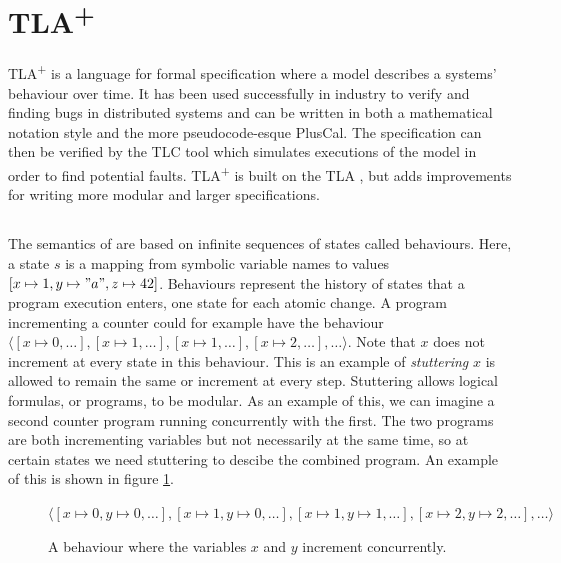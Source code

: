 \documentclass[english, biblatex, digitaloutput]{kththesis}
\begin{document}

\section{TLA\textsuperscript+}

TLA\textsuperscript+ \cite{lamport_specifying_2001} is a language for formal specification where a model describes a systems' behaviour over time. It has been used successfully in industry to verify and finding bugs in distributed systems \cite{joshi_checking_2003,newcombe_how_2015} and can be written in both a mathematical notation style and the more pseudocode-esque PlusCal. The specification can then be verified by the TLC tool which simulates executions of the model in order to find potential faults. TLA\textsuperscript+ is built on the \gls{TLA} \cite{lamport_temporal_1994}, but adds improvements for writing more modular and larger specifications.

\subsection{}
\label{subsec:tla}

The semantics of  are based on infinite sequences of states called behaviours. Here, a state $s$ is a mapping from symbolic variable names to values \eg $[x \mapsto 1, y \mapsto "a", z \mapsto 42]$. Behaviours represent the history of states that a program execution enters, one state for each atomic change. A program incrementing a counter could for example have the behaviour $\langle [x \mapsto 0, \dotsc], [x \mapsto 1, \dotsc], [x \mapsto 1, \dotsc], [x \mapsto 2, \dotsc], \dotsc \rangle$. Note that $x$ does not increment at every state in this behaviour. This is an example of \textit{stuttering} \ie $x$ is allowed to remain the same or increment at every step. Stuttering allows logical formulas, or programs, to be modular. As an example of this, we can imagine a second counter program running concurrently with the first. The two programs are both incrementing variables but not necessarily at the same time, so at certain states we need stuttering to descibe the combined program. An example of this is shown in figure \ref{fig:concurrent-behaviour}.

\begin{figure}
	$\langle [x \mapsto 0, y \mapsto 0, \dotsc], [x \mapsto 1, y \mapsto 0, \dotsc], [x \mapsto 1, y \mapsto 1, \dotsc], [x \mapsto 2, y \mapsto 2, \dotsc], \dotsc \rangle$
	\caption{A behaviour where the variables $x$ and $y$ increment concurrently.}
	\label{fig:concurrent-behaviour}
\end{figure}
\end{document}
